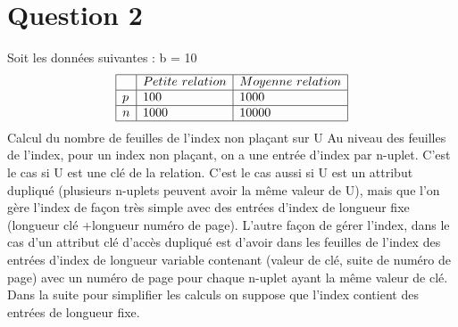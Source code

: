 \documentclass[11pt]{article}
\begin{document}
\section{Question 2}
Soit les données suivantes : 
b = 10
$$
\begin{array}{|l|l|l|}
\hline
& Petite~relation & Moyenne~relation\\\hline
p & 100 & 1000\\\hline
n & 1000 & 10000\\\hline
\end{array}
$$
Calcul du nombre de feuilles de l'index non plaçant sur U
Au niveau des feuilles de l'index, pour un index non plaçant, on a une entrée d'index par n-uplet. C'est le cas si U est une clé de la relation. C'est le cas aussi si U est un attribut dupliqué (plusieurs n-uplets peuvent avoir la même valeur de U), mais que l'on gère l'index de façon très simple avec des entrées d'index de longueur fixe (longueur clé +longueur numéro de page).
L'autre façon de gérer l'index, dans le cas d'un attribut clé d'accès dupliqué est d'avoir dans les feuilles de l'index des entrées d'index de longueur variable contenant (valeur de clé, suite de numéro de page) avec un numéro de page pour chaque n-uplet ayant la même valeur de clé. Dans la suite pour simplifier les calculs on suppose que l'index contient des entrées de longueur fixe.
\end{document}
